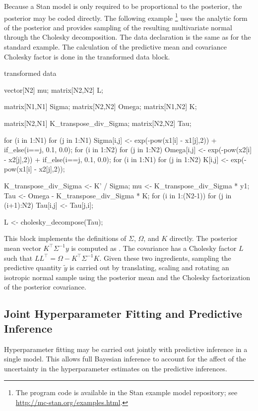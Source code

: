 Because a Stan model is only required to be proportional to the
posterior, the posterior may be coded directly.  The following
example%
%
\footnote{The program code is available in the Stan example model repository;
see \url{http://mc-stan.org/examples.html}.}
%
uses the analytic form of the posterior and provides sampling of the
resulting multivariate normal through the Cholesky decomposition.
The data declaration is the same as for the standard example.  The
calculation of the predictive mean  and covariance Cholesky
factor  is done in the transformed data block.
%
\begin{stancode}
transformed data {
  vector[N2] mu;
  matrix[N2,N2] L;
  { 
    matrix[N1,N1] Sigma;
    matrix[N2,N2] Omega;
    matrix[N1,N2] K;
    
    matrix[N2,N1] K_transpose_div_Sigma;
    matrix[N2,N2] Tau;

    for (i in 1:N1) 
      for (j in 1:N1)
        Sigma[i,j] <- exp(-pow(x1[i] - x1[j],2)) 
          + if_else(i==j, 0.1, 0.0);
    for (i in 1:N2) 
      for (j in 1:N2)
        Omega[i,j] <- exp(-pow(x2[i] - x2[j],2)) 
          + if_else(i==j, 0.1, 0.0); 
    for (i in 1:N1)
      for (j in 1:N2)
        K[i,j] <- exp(-pow(x1[i] - x2[j],2));
    
    K_transpose_div_Sigma <- K' / Sigma;
    mu <- K_transpose_div_Sigma * y1; 
    Tau <- Omega - K_transpose_div_Sigma * K;
    for (i in 1:(N2-1))
      for (j in (i+1):N2)
        Tau[i,j] <- Tau[j,i];

    L <- cholesky_decompose(Tau);
  }
}
\end{stancode}
%
This block implements the definitions of $\Sigma$, $\Omega$, and $K$
directly.  The posterior mean vector $K^{\top}\Sigma^{-1}y$ is
computed as .  The covariance has a Cholesky factor $L$ such
that $LL^{\top} = \Omega - K^{\top}\Sigma^{-1}K$.  Given these two
ingredients, sampling the predictive quantity $\tilde{y}$ is carried
out by translating, scaling and rotating an isotropic normal sample 
using the posterior mean and the Cholesky factorization of the
posterior covariance.


\subsection{Joint Hyperparameter Fitting and Predictive Inference}

Hyperparameter fitting may be carried out jointly with predictive
inference in a single model.  This allows full Bayesian inference to
account for the affect of the uncertainty in the hyperparameter
estimates on the predictive inferences.  

